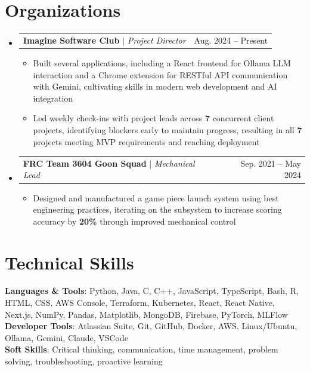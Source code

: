 \documentclass[letterpaper,11pt]{article}
\makeatletter
\newcommand{\resumeItem}[1]{
  \item\small{
    {#1 \vspace{-4pt}}
  }
}
\newcommand{\resumeProjectHeading}[2]{
    \item
    \begin{tabular*}{0.97\textwidth}{l@{\extracolsep{\fill}}r}
      \small#1 & #2 \\
    \end{tabular*}\vspace{-7pt}
}
\newcommand{\resumeSubHeadingListStart}{\begin{itemize}[leftmargin=0.15in, label={}]}
\newcommand{\resumeSubHeadingListEnd}{\end{itemize}}
\newcommand{\resumeItemListStart}{\begin{itemize}}
\newcommand{\resumeItemListEnd}{\end{itemize}\vspace{-5pt}}
\makeatother
\begin{document}
\section{Organizations}
  \resumeSubHeadingListStart
  
    \resumeProjectHeading
      {\textbf{Imagine Software Club} $|$ \emph{Project Director}}{Aug. 2024 -- Present}
      \resumeItemListStart
        \resumeItem{Built several applications, including a React frontend for Ollama LLM interaction and a Chrome extension for RESTful API communication with Gemini, cultivating skills in modern web development and AI integration}
        \resumeItem{Led weekly check-ins with project leads across \textbf{7} concurrent client projects, identifying blockers early to maintain progress, resulting in all \textbf{7} projects meeting MVP requirements and reaching deployment}
      \resumeItemListEnd

    \resumeProjectHeading
      {\textbf{FRC Team 3604 Goon Squad} $|$ \emph{Mechanical Lead}}{Sep. 2021 -- May 2024}
      \resumeItemListStart
        \resumeItem{Designed and manufactured a game piece launch system using best engineering practices, iterating on the subsystem to increase scoring accuracy by \textbf{20\%} through improved mechanical control}
      \resumeItemListEnd

 \resumeSubHeadingListEnd
 
%
\section{Technical Skills}
 \begin{itemize}[leftmargin=0.15in, label={}]
    \small{\item{
     \textbf{Languages \& Tools}{: Python, Java, C, C++, JavaScript, TypeScript, Bash, R, HTML, CSS, AWS Console, Terraform, Kubernetes, React, React Native, Next.js, NumPy, Pandas, Matplotlib, MongoDB, Firebase, PyTorch, MLFlow} \\
     \textbf{Developer Tools}{: Atlassian Suite, Git, GitHub, Docker, AWS, Linux/Ubuntu, Ollama, Gemini, Claude, VSCode} \\
     \textbf{Soft Skills}{: Critical thinking, communication, time management, problem solving, troubleshooting, proactive learning} \\
    }}
 \end{itemize}


\end{document}
